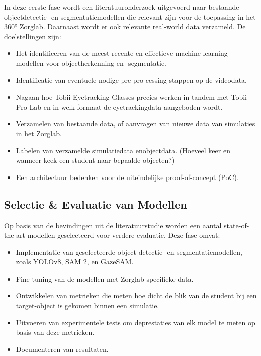 In deze eerste fase wordt een literatuuronderzoek uitgevoerd naar bestaande objectdetectie- en segmentatiemodellen die relevant zijn 
voor de toepassing in het 360° Zorglab. Daarnaast wordt er ook relevante real-world data verzameld.
De doelstellingen zijn: 
\begin{itemize} 
  \item Het identificeren van de meest recente en effectieve machine-learning modellen voor objectherkenning en -segmentatie. 
  \item Identificatie van eventuele nodige pre-pro-\newline cessing stappen op de videodata.
  \item Nagaan hoe Tobii Eyetracking Glasses precies werken in tandem met Tobii Pro Lab en in welk formaat de eyetrackingdata aangeboden wordt.
  \item Verzamelen van bestaande data, of aanvragen van nieuwe data van simulaties in het Zorglab.
  \item Labelen van verzamelde simulatiedata en\newline objectdata. (Hoeveel keer en wanneer keek een student naar bepaalde objecten?)
  \item Een architectuur bedenken voor de uiteindelijke proof-of-concept (PoC).
\end{itemize}

\subsection{Selectie \& Evaluatie van Modellen}

Op basis van de bevindingen uit de literatuurstudie worden een aantal state-of-the-art modellen geselecteerd voor verdere evaluatie. 
Deze fase omvat: 
\begin{itemize} 
  \item Implementatie van geselecteerde object-\newline detectie- en segmentatiemodellen, zoals \newline YOLOv8, SAM 2, en GazeSAM. 
  \item Fine-tuning van de modellen met Zorglab-specifieke data.
  \item Ontwikkelen van metrieken die meten hoe dicht de blik van de student bij een target-object is gekomen binnen een simulatie.
  \item Uitvoeren van experimentele tests om de\newline prestaties van elk model te meten op basis van deze metrieken.
  \item Documenteren van resultaten.
\end{itemize}

